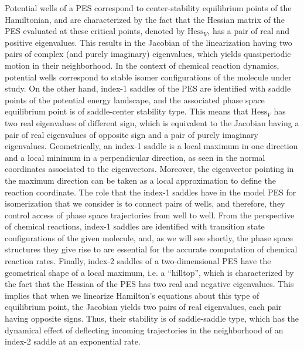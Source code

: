 \documentclass[10pt,aps,onecolumn,superscriptaddress]{revtex4-2}
\begin{document}
Potential wells of a PES correspond to center-stability equilibrium points of the Hamiltonian, and are characterized by the fact that the Hessian matrix of the PES evaluated at these critical points, denoted by $\text{Hess}_V$, has a pair of real and positive eigenvalues. This results in the Jacobian of the linearization having two pairs of complex (and purely imaginary) eigenvalues, which yields quasiperiodic motion in their neighborhood. In the context of chemical reaction dynamics, potential wells correspond to stable isomer configurations of the molecule under study. On the other hand, index-1 saddles of the PES are identified with saddle points of the potential energy landscape, and the associated phase space equilibrium point is of saddle-center stability type. This means that $\text{Hess}_V$ has two real eigenvalues of different sign, which is equivalent to the Jacobian having a pair of real eigenvalues of opposite sign and a pair of purely imaginary eigenvalues. Geometrically, an index-1 saddle is a local maximum in one direction and a local minimum in a perpendicular direction, as seen in the normal coordinates associated to the eigenvectors. Moreover, the eigenvector pointing in the maximum direction can be taken as a local approximation to define the reaction coordinate. The role that the index-1 saddles have in the model PES for isomerization that we  consider is to connect pairs of wells, and therefore, they control access of phase space trajectories from well to well. From the perspective of chemical reactions, index-1 saddles are identified with transition state configurations of the given molecule, and, as we will see shortly, the phase space structures they give rise to are essential for the accurate computation of chemical reaction rates. Finally, index-2 saddles of a two-dimensional PES have the geometrical shape of a local maximum, i.e. a ``hilltop'', which is characterized by the fact that the Hessian of the PES has two real and negative eigenvalues. This implies that when we linearize Hamilton's equations about this type of equilibrium point, the Jacobian yields two pairs of real eigenvalues, each pair having opposite signs. Thus, their stability is of saddle-saddle type, which has the dynamical effect of deflecting incoming trajectories in the neighborhood of an index-2 saddle at an exponential rate.
\end{document}
